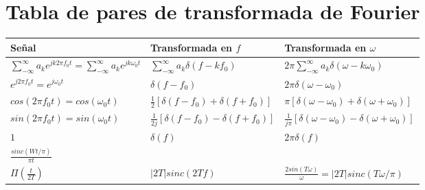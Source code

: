 \documentclass[a4paper, 10pt]{article}
\begin{document}
\section{Tabla de pares de transformada de Fourier}

\begin{adjustbox}{width = \textwidth}
    \centering
    \begin{tabular}{p{} | p{} | p{}}
        \hline
        Señal & Transformada en $f$ & Transformada en $\omega$ \\
        \hline
        $\sum_{-\infty}^{\infty}a_ke^{jk2\pi f_0t} = \sum_{-\infty}^{\infty}a_ke^{jk\omega_0t}$ & $\sum_{-\infty}^{\infty}a_k\delta(f - kf_0)$ & $2\pi\sum_{-\infty}^{\infty}a_k\delta(\omega - k\omega_0)$\\
        \hline
        $e^{j2\pi f_0t} = e^{j\omega_0t}$ & $\delta(f - f_0)$ & $2\pi\delta(\omega - \omega_0)$ \\
        \hline
        $cos(2\pi f_0t) = cos(\omega_0t)$ & $\frac{1}{2}[\delta(f - f_0) + \delta(f + f_0)]$& $\pi[\delta(\omega - \omega_0) + \delta(\omega + \omega_0)]$\\
        \hline
        $sin(2\pi f_0t) = sin(\omega_0t)$ & $\frac{1}{2j}[\delta(f - f_0) - \delta(f + f_0)]$& $\frac{1}{j\pi}[\delta(\omega - \omega_0) - \delta(\omega + \omega_0)]$\\
        \hline
        $1$ & $\delta(f)$ & $2\pi\delta(f)$ \\
        \hline
        $\frac{sinc(W t / \pi)}{\pi t}$ & & \\
        \hline



        $\Pi(\frac{t}{2T})$ & $|2T|sinc(2Tf)$ & $\frac{2sin(T\omega)}{\omega} = |2T|sinc(T\omega/\pi)$ \\


        \hline
    \end{tabular}

\end{adjustbox}
\end{document}
